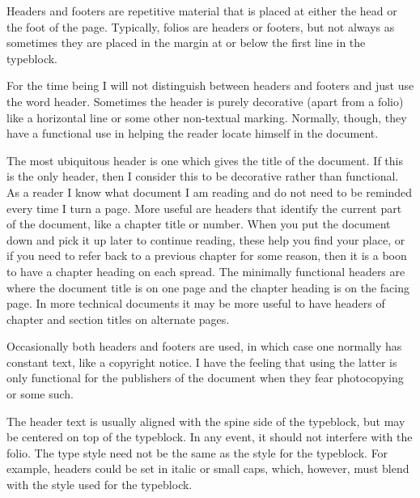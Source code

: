 \documentclass[10pt,a4paper,extrafontsizes]{memoir}
\begin{document}
\begin{paracol}{2}
\switchEng
    Headers and footers are repetitive material that is placed at either 
the head or the foot of the page. Typically, folios are headers 
or footers, but not always as sometimes they are placed in the 
margin at or below the first line in the 
typeblock.

   For the time being I will not distinguish between headers and footers and 
just use the word header. Sometimes the header is purely decorative (apart
from a folio) like a horizontal line or some other non-textual 
marking. Normally, though, they have a functional use in helping the 
reader locate himself in the document.

    The most ubiquitous header is one which gives the title of the document.
If this is the only header, then I consider this to be decorative rather
than functional. As a reader I know what document I am reading and do not
need to be reminded every time I turn a page. More useful are headers that
identify the current part of the document, like a chapter 
title or number.
When you put the document down and pick it up later to continue reading, these
help you find your place, or if you need to refer back to a previous chapter
for some reason, then it is a boon to have a chapter heading 
on each 
spread. The minimally functional headers are where the document title
is on one page and the chapter heading is on the facing page. In more technical
documents it may be more useful to have headers of chapter and section titles
on alternate pages. 

    Occasionally both headers and footers are used, in which case one normally
has constant text, like a copyright notice. 
I have the feeling that using the latter is only functional for the 
publishers of the document when they fear photocopying or some such.

    The header text is usually aligned with the spine side 
of the typeblock, but may be centered on top of the 
typeblock. In any event, it should not interfere with 
the folio. The type style need not be the same as the style 
for the typeblock. For example, headers could be set in italic
or small caps, which, however, must blend with the style used for the 
typeblock.
\end{paracol}
\end{document}
